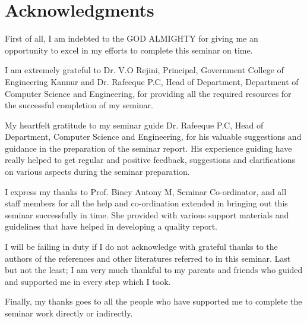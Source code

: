 \chapter*{Acknowledgments}
First of all, I am indebted to the GOD ALMIGHTY for giving me an opportunity to excel in my efforts to complete this seminar on time.

I am extremely grateful to Dr. V.O Rejini, Principal, Government College of Engineering Kannur and Dr. Rafeeque P.C, Head of Department, Department of Computer Science and Engineering, for providing all the required resources for the successful completion of my seminar.

My heartfelt gratitude to my seminar guide Dr. Rafeeque P.C, Head of Department, Computer Science and Engineering, for his valuable suggestions and guidance in the preparation of the seminar report. His experience guiding have really helped to get regular and positive feedback, suggestions and clarifications on various aspects during the seminar preparation.

I express my thanks to Prof. Bincy Antony M, Seminar Co-ordinator, and all staff members for all the help and co-ordination extended in bringing out this seminar successfully in time. She provided with various support materials and guidelines that have helped in developing a quality report.

I will be failing in duty if I do not acknowledge with grateful thanks to the authors of the references and other literatures referred to in this seminar. Last but not the least; I am very much thankful to my parents and friends who guided and supported me in every step which I took.

Finally, my thanks goes to all the people who have supported me to complete the seminar work directly or indirectly.

\hfill \studentName
